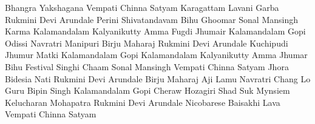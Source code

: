 \answerkey
{} Bhangra
 Yakshagana
 Vempati Chinna Satyam
 Karagattam
 Lavani
 Garba
 Rukmini Devi Arundale
 Perini Shivatandavam
 Bihu
 Ghoomar
 Sonal Mansingh
 Karma
 Kalamandalam Kalyanikutty Amma
 Fugdi
 Jhumair
 Kalamandalam Gopi
 Odissi
 Navratri
 Manipuri
 Birju Maharaj
 Rukmini Devi Arundale
 Kuchipudi
 Jhumur
 Matki
 Kalamandalam Gopi
 Kalamandalam Kalyanikutty Amma
 Jhumar
 Bihu Festival
 Singhi Chaam
 Sonal Mansingh
 Vempati Chinna Satyam
 Jhora
 Bidesia
 Nati
 Rukmini Devi Arundale
 Birju Maharaj
 Aji Lamu
 Navratri
 Chang Lo
 Guru Bipin Singh
 Kalamandalam Gopi
 Cheraw
 Hozagiri
 Shad Suk Mynsiem
 Kelucharan Mohapatra
 Rukmini Devi Arundale
 Nicobarese
 Baisakhi
 Lava
 Vempati Chinna Satyam
\endanswerkey